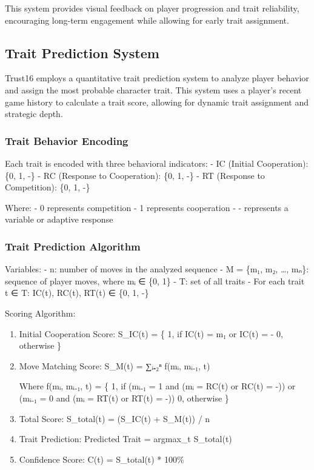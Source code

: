 \documentclass[]{article}
\begin{document}
This system provides visual feedback on player progression and trait
reliability, encouraging long-term engagement while allowing for early
trait assignment.

\hypertarget{trait-prediction-system}{%
\subsection{Trait Prediction System}\label{trait-prediction-system}}

Trust16 employs a quantitative trait prediction system to analyze player
behavior and assign the most probable character trait. This system uses
a player's recent game history to calculate a trait score, allowing for
dynamic trait assignment and strategic depth.

\hypertarget{trait-behavior-encoding}{%
\subsubsection{Trait Behavior
Encoding}\label{trait-behavior-encoding}}

Each trait is encoded with three behavioral indicators: - IC (Initial
Cooperation): \{0, 1, -\} - RC (Response to Cooperation): \{0, 1, -\} -
RT (Response to Competition): \{0, 1, -\}

Where: - 0 represents competition - 1 represents cooperation - -
represents a variable or adaptive response

\hypertarget{trait-prediction-algorithm}{%
\subsubsection{Trait Prediction
Algorithm}\label{trait-prediction-algorithm}}

Variables: - n: number of moves in the analyzed sequence - M = \{m₁, m₂,
\ldots, mₙ\}: sequence of player moves, where mᵢ ∈ \{0, 1\} - T: set of
all traits - For each trait t ∈ T: IC(t), RC(t), RT(t) ∈ \{0, 1, -\}

Scoring Algorithm:

\begin{enumerate}
\def\labelenumi{\arabic{enumi}.}
\item
  Initial Cooperation Score: S\_IC(t) = \{ 1, if IC(t) = m₁ or IC(t) = -
  0, otherwise \}
\item
  Move Matching Score: S\_M(t) = ∑ᵢ₌₂ⁿ f(mᵢ, mᵢ₋₁, t)

  Where f(mᵢ, mᵢ₋₁, t) = \{ 1, if (mᵢ₋₁ = 1 and (mᵢ = RC(t) or RC(t) =
  -)) or (mᵢ₋₁ = 0 and (mᵢ = RT(t) or RT(t) = -)) 0, otherwise \}
\item
  Total Score: S\_total(t) = (S\_IC(t) + S\_M(t)) / n
\item
  Trait Prediction: Predicted Trait = argmax\_t S\_total(t)
\item
  Confidence Score: C(t) = S\_total(t) * 100\%
\end{enumerate}
\end{document}
